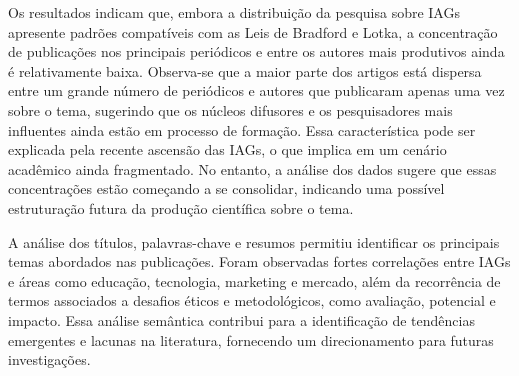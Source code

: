\documentclass[openany,oneside,a4paper,9pt]{extarticle}
\begin{document}
 Os resultados indicam que, embora a distribuição da pesquisa sobre IAGs apresente padrões compatíveis com as Leis de Bradford e Lotka, a concentração de publicações nos principais periódicos e entre os autores mais produtivos ainda é relativamente baixa. Observa-se que a maior parte dos artigos está dispersa entre um grande número de periódicos e autores que publicaram apenas uma vez sobre o tema, sugerindo que os núcleos difusores e os pesquisadores mais influentes ainda estão em processo de formação. Essa característica pode ser explicada pela recente ascensão das IAGs, o que implica em um cenário acadêmico ainda fragmentado. No entanto, a análise dos dados sugere que essas concentrações estão começando a se consolidar, indicando uma possível estruturação futura da produção científica sobre o tema.

 A análise dos títulos, palavras-chave e resumos permitiu identificar os principais temas abordados nas publicações. Foram observadas fortes correlações entre IAGs e áreas como educação, tecnologia, marketing e mercado, além da recorrência de termos associados a desafios éticos e metodológicos, como avaliação, potencial e impacto. Essa análise semântica contribui para a identificação de tendências emergentes e lacunas na literatura, fornecendo um direcionamento para futuras investigações.
 
\printbibliography
\end{document}
